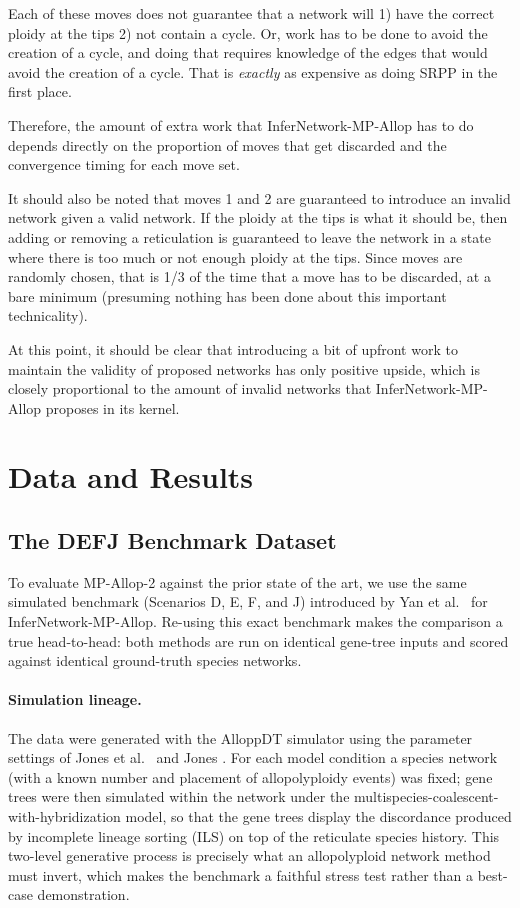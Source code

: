\documentclass{article}
\begin{document}
Each of these moves does not guarantee that a network will 1) have the correct ploidy at the tips 2) not contain a cycle. Or, work has to be done to avoid the creation of a cycle, and doing that requires knowledge of the edges that would avoid the creation of a cycle. That is \textit{exactly} as expensive as doing SRPP in the first place.

Therefore, the amount of extra work that InferNetwork-MP-Allop has to do depends directly on the proportion of moves that get discarded and the convergence timing for each move set.

It should also be noted that moves 1 and 2 are guaranteed to introduce an invalid network given a valid network. If the ploidy at the tips is what it should be, then adding or removing a reticulation is guaranteed to leave the network in a state where there is too much or not enough ploidy at the tips. Since moves are randomly chosen, that is 1/3 of the time that a move has to be discarded, at a bare minimum (presuming nothing has been done about this important technicality).

At this point, it should be clear that introducing a bit of upfront work to maintain the validity of proposed networks has only positive upside, which is closely proportional to the amount of invalid networks that InferNetwork-MP-Allop proposes in its kernel.


\section{Data and Results}\label{sec:results}

\subsection{\color{bluem}The DEFJ Benchmark Dataset}\label{sec:defj}

To evaluate MP-Allop-2 against the prior state of the art, we use the same
simulated benchmark (Scenarios D, E, F, and J) introduced by Yan et al.\
\cite{YanAllop} for InferNetwork-MP-Allop. Re-using this exact benchmark makes
the comparison a true head-to-head: both methods are run on identical gene-tree
inputs and scored against identical ground-truth species networks.

\paragraph{Simulation lineage.} The data were generated with the AlloppDT
simulator \cite{AlloppDT} using the parameter settings of Jones et al.\
\cite{AlloppNET} and Jones \cite{Jones2017}. For each model condition a
species network (with a known number and placement of allopolyploidy events)
was fixed; gene trees were then simulated within the network under the
multispecies-coalescent-with-hybridization model, so that the gene trees
display the discordance produced by incomplete lineage sorting (ILS) on top of
the reticulate species history. This two-level generative process is precisely
what an allopolyploid network method must invert, which makes the benchmark a
faithful stress test rather than a best-case demonstration.
\end{document}
